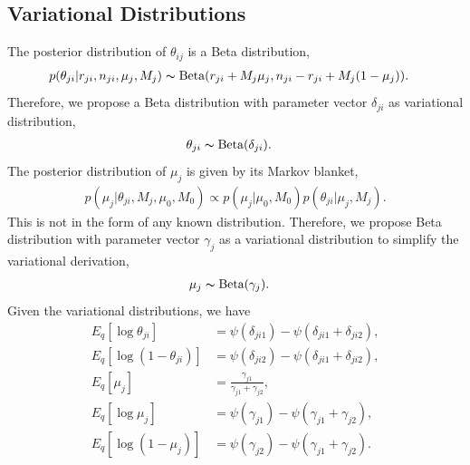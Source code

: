 \documentclass[11pt,reqno]{amsart}
\begin{document}
\subsection{Variational Distributions}
The posterior distribution of $\theta_{ij}$ is a Beta distribution,
\begin{align}
&p(\theta_{ji}|r_{ji},n_{ji},\mu_j,M_j)
\thicksim \text{Beta}(r_{ji}+M_j \mu_j, n_{ji}-r_{ji}+M_j(1-\mu_j)).
\end{align}
Therefore, we propose a Beta distribution with parameter vector $\delta_{ji}$ as variational distribution,
\begin{align}
\theta_{ji} &\thicksim \text{Beta}(\delta_{ji}) \nonumber.
\end{align}
%
The posterior distribution of $\mu_j$ is given by its Markov blanket,
\begin{align}
p(\mu_j|\theta_{ji},M_j,\mu_0,M_0)\propto p(\mu_j|\mu_0,M_0)p(\theta_{ji}|\mu_j,M_j).
\end{align}
This is not in the form of any known distribution.
Therefore, we propose Beta distribution with parameter vector $\gamma_{j}$ as a variational distribution to simplify the variational derivation,
\begin{align}
\mu_j &\thicksim \text{Beta}(\gamma_j) \nonumber.
\end{align}
Given the variational distributions, we have
\begin{align}
E_q \left[ \log \theta_{ji} \right] &= \psi(\delta_{ji1}) - \psi(\delta_{ji1}+\delta_{ji2}) \nonumber, \\
E_q \left[ \log \left( 1 - \theta_{ji}\right) \right]&= \psi(\delta_{ji2}) - \psi(\delta_{ji1}+\delta_{ji2}) \nonumber, \\
E_q \left[ \mu_j \right] &= \frac{\gamma_{j1}}{\gamma_{j1} + \gamma_{j2}} \nonumber, \\
E_q  \left[ \log \mu_j \right] &= \psi(\gamma_{j1}) - \psi(\gamma_{j1}+\gamma_{j2}) \nonumber, \\
E_q  \left[ \log (1 - \mu_j)\right] &= \psi(\gamma_{j2}) - \psi(\gamma_{j1}+\gamma_{j2})\nonumber. \\
\end{align}
\end{document}
